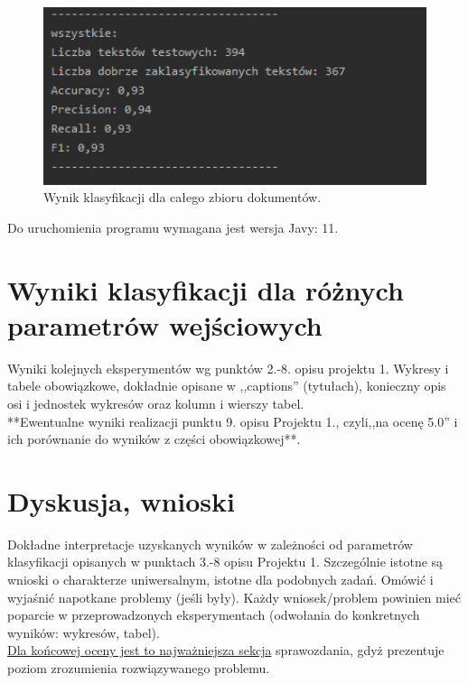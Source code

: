 \documentclass{classrep}
\begin{document}
\begin{figure}[h!]
 \centering
 \includegraphics[width=14cm]{wynik.png}
 \vspace{-0.3cm}
 \caption{Wynik klasyfikacji dla całego zbioru dokumentów.}
 \label{Wynik klasyfikacji.}
\end{figure}
\newpage

Do uruchomienia programu wymagana jest wersja Javy: 11. 



\section{Wyniki klasyfikacji dla różnych parametrów wejściowych}
Wyniki kolejnych eksperymentów wg punktów 2.-8. opisu projektu 1.  Wykresy i tabele
obowiązkowe, dokładnie opisane w ,,captions'' (tytułach), konieczny opis osi i
jednostek wykresów oraz kolumn i wierszy tabel.\\ 

{**Ewentualne wyniki realizacji punktu 9. opisu Projektu 1., czyli,,na ocenę 5.0'' i ich porównanie do wyników z
części obowiązkowej**.}\\



\section{Dyskusja, wnioski}

Dokładne interpretacje uzyskanych wyników w zależności od parametrów klasyfikacji
opisanych w punktach 3.-8 opisu Projektu 1. 
Szczególnie istotne są wnioski o charakterze uniwersalnym, istotne dla podobnych zadań. 
Omówić i wyjaśnić napotkane problemy (jeśli były). Każdy wniosek/problem powinien mieć poparcie
w przeprowadzonych eksperymentach (odwołania do konkretnych wyników: wykresów,
tabel). \\
\underline{Dla końcowej oceny jest to najważniejsza sekcja} sprawozdania, gdyż prezentuje poziom
zrozumienia rozwiązywanego problemu.\\
\end{document}
